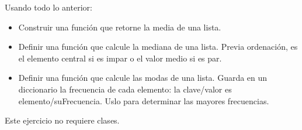 Usando  todo lo anterior:
\begin{itemize}
\item Construir una función que retorne la media de una lista.

\item Definir una función que calcule la mediana de una lista.
Previa ordenación, es el elemento central si es impar o el valor medio si es par.

\item Definir una función que calcule las modas de una lista. 
Guarda en un diccionario la frecuencia de cada elemento: la clave/valor es elemento/suFrecuencia.  Uslo para determinar las mayores frecuencias.

\end{itemize}

Este ejercicio no requiere clases.


%
%    
%
%







